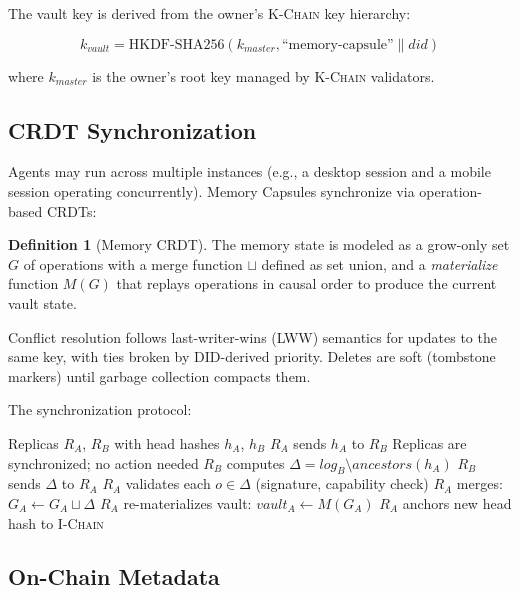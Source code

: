 \documentclass[11pt,letterpaper]{article}
\theoremstyle{definition}
\newtheorem{definition}{Definition}
\theoremstyle{remark}
\newcommand{\IChain}{\textsc{I-Chain}}
\newcommand{\KChain}{\textsc{K-Chain}}
\newcommand{\DID}{\textsc{DID}}
\begin{document}
The vault key is derived from the owner's \KChain{} key hierarchy:

\begin{equation}
k_{\textit{vault}} = \text{HKDF-SHA256}(k_{\textit{master}}, \text{``memory-capsule''} \| \textit{did})
\end{equation}

where $k_{\textit{master}}$ is the owner's root key managed by \KChain{} validators.

\subsection{CRDT Synchronization}

Agents may run across multiple instances (e.g., a desktop session and a mobile session operating concurrently). Memory Capsules synchronize via operation-based CRDTs:

\begin{definition}[Memory CRDT]
The memory state is modeled as a grow-only set $G$ of operations with a merge function $\sqcup$ defined as set union, and a \emph{materialize} function $M(G)$ that replays operations in causal order to produce the current vault state.
\end{definition}

Conflict resolution follows last-writer-wins (LWW) semantics for updates to the same key, with ties broken by \DID{}-derived priority. Deletes are soft (tombstone markers) until garbage collection compacts them.

The synchronization protocol:

\begin{algorithm}
\caption{CRDT Sync Between Capsule Replicas}
\begin{algorithmic}[1]
\REQUIRE Replicas $R_A$, $R_B$ with head hashes $h_A$, $h_B$
\STATE $R_A$ sends $h_A$ to $R_B$
    \STATE Replicas are synchronized; no action needed
\ELSE
    \STATE $R_B$ computes $\Delta = \textit{log}_B \setminus \textit{ancestors}(h_A)$
    \STATE $R_B$ sends $\Delta$ to $R_A$
    \STATE $R_A$ validates each $o \in \Delta$ (signature, capability check)
    \STATE $R_A$ merges: $G_A \leftarrow G_A \sqcup \Delta$
    \STATE $R_A$ re-materializes vault: $\textit{vault}_A \leftarrow M(G_A)$
    \STATE $R_A$ anchors new head hash to \IChain{}
\ENDIF
\end{algorithmic}
\end{algorithm}

\subsection{On-Chain Metadata}
\end{document}
